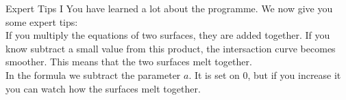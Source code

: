 \begin{surferPage}{Expert Tips I}
You have learned a lot about the programme. We now give you some expert tips:\\
\vspace{0.3cm}
If you multiply the equations of two surfaces, they are added together. If you know subtract a small value from this product, the intersaction curve becomes smoother. This means that the two surfaces melt together.\\
\vspace{0.3cm}
In the formula we subtract the parameter $a$. It is set on 0, but if you increase it you can watch how the surfaces melt together.
\end{surferPage}
